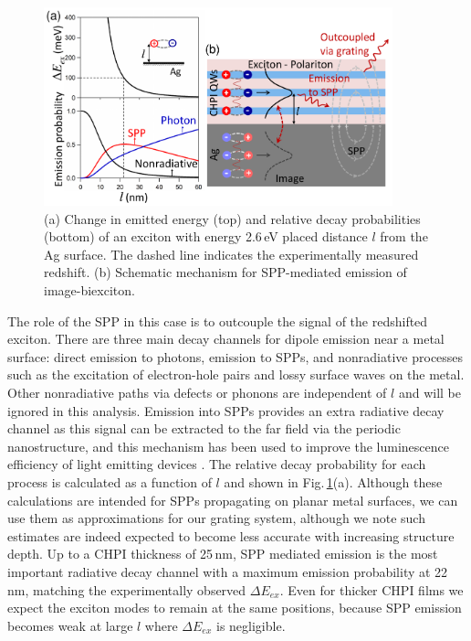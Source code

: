 \begin{figure}[h!] 
\centering
\includegraphics[width=0.9\textwidth]{Fig16}
\caption{(a) Change in emitted energy (top) and relative decay probabilities (bottom) of an exciton with energy 2.6\,eV placed distance $l$ from the Ag surface. The dashed line indicates the experimentally measured redshift. (b) Schematic mechanism for SPP-mediated emission of image-biexciton.}
\label{7Fig16}
\end{figure}
The role of the SPP in this case is to outcouple the signal of the redshifted exciton. There are three main decay channels for dipole emission near a metal surface: direct emission to photons, emission to SPPs, and nonradiative processes such as the excitation of electron-hole pairs and lossy surface waves on the metal. Other nonradiative paths via defects or phonons are independent of $l$ and will be ignored in this analysis. Emission into SPPs provides an extra radiative decay channel as this signal can be extracted to the far field via the periodic nanostructure, and this mechanism has been used to improve the luminescence efficiency of light emitting devices \cite{Frischeisen2011, Kumar2012}. The relative decay probability for each process is calculated as a function of $l$ \cite{Ford1984} and shown in Fig.\,\ref{7Fig16}(a). Although these calculations are intended for SPPs propagating on planar metal surfaces, we can use them as approximations for our grating system, although we note such estimates are indeed expected to become less accurate with increasing structure depth. Up to a CHPI thickness of 25\,nm, SPP mediated emission is the most important radiative decay channel with a maximum emission probability at 22\,nm, matching the experimentally observed $\Delta E_{ex}$. Even for thicker CHPI films we expect the exciton modes to remain at the same positions, because SPP emission becomes weak at large $l$ where $\Delta E_{ex}$ is negligible.

